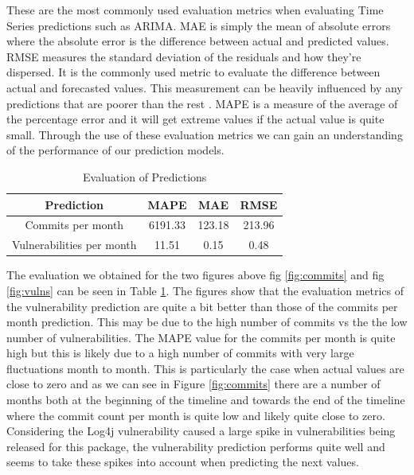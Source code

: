 \documentclass[conference]{IEEEtran}
\begin{document}
These are the most commonly used evaluation metrics when evaluating Time Series predictions such as ARIMA. MAE is simply the mean of absolute errors where the absolute error is the difference between actual and predicted values. RMSE measures the standard deviation of the residuals and how they're dispersed. It is the commonly used metric to evaluate the difference between actual and forecasted values. This measurement can be heavily influenced by any predictions that are poorer than the rest \cite{f_abdulhafidh_dael_performance_2022}. MAPE is a measure of the average of the percentage error and it will get extreme values if the actual value is quite small. Through the use of these evaluation metrics we can gain an understanding of the performance of our prediction models. 

\begin{table}[H]
 \caption{Evaluation of Predictions}
\label{evaluations}
\begin{center}
\begin{tabular}{|c|c|c|c|}
\hline
    \textbf{Prediction} & \textbf{MAPE} & \textbf{MAE} & \textbf{RMSE} \\ \hline
    Commits per month & 6191.33 & 123.18 & 213.96 \\ \hline
    Vulnerabilities per month & 11.51 & 0.15 & 0.48 \\ \hline
\end{tabular}
\end{center}
\end{table}

The evaluation we obtained for the two figures above fig \ref{fig:commits} and fig \ref{fig:vulns} can be seen in Table \ref{evaluations}. The figures show that the evaluation metrics of the vulnerability prediction are quite a bit better than those of the commits per month prediction. This may be due to the high number of commits vs the the low number of vulnerabilities. The MAPE value for the commits per month is quite high but this is likely due to a high number of commits with very large fluctuations month to month. This is particularly the case when actual values are close to zero and as we can see in Figure \ref{fig:commits} there are a number of months both at the beginning of the timeline and towards the end of the timeline where the commit count per month is quite low and likely quite close to zero. Considering the Log4j vulnerability caused a large spike in vulnerabilities being released for this package, the vulnerability prediction performs quite well and seems to take these spikes into account when predicting the next values. 
\end{document}
